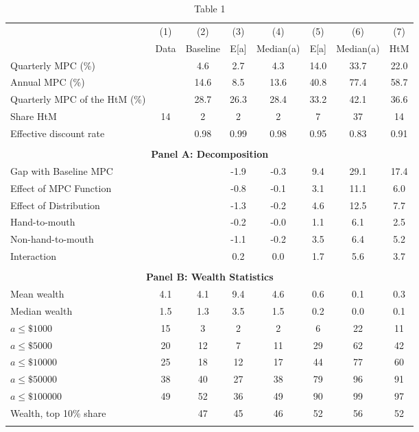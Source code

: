 
    \begin{table}[ht] %
    \caption*{Table 1} %
    \centering
    \begin{threeparttable} %
    \begin{tabular}{lccccccc}
    \toprule
    {} &  (1)  &  (2)  &  (3)  &  (4)  &  (5)  &  (6)  &  (7)  \\
     & Data & Baseline & E[a] & Median(a) & E[a] & Median(a) & HtM \\
    \midrule
    Quarterly MPC (\%) &  & 4.6 & 2.7 & 4.3 & 14.0 & 33.7 & 22.0 \\ 
    Annual MPC (\%) &  & 14.6 & 8.5 & 13.6 & 40.8 & 77.4 & 58.7 \\ 
    Quarterly MPC of the HtM (\%) &  & 28.7 & 26.3 & 28.4 & 33.2 & 42.1 & 36.6 \\ 
    Share HtM & 14 & 2 & 2 & 2 & 7 & 37 & 14 \\ 
    Effective discount rate &  & 0.98 & 0.99 & 0.98 & 0.95 & 0.83 & 0.91 \\ 
     & & & & & & & \\ 
    \toprule
    \multicolumn{8}{c}{\textbf{Panel A: Decomposition}} \\
    \midrule
    Gap with Baseline MPC &  &  & -1.9 & -0.3 & 9.4 & 29.1 & 17.4 \\ 
    Effect of MPC Function &  &  & -0.8 & -0.1 & 3.1 & 11.1 & 6.0 \\ 
    Effect of Distribution &  &  & -1.3 & -0.2 & 4.6 & 12.5 & 7.7 \\ 
    \quad Hand-to-mouth &  &  & -0.2 & -0.0 & 1.1 & 6.1 & 2.5 \\ 
    \quad Non-hand-to-mouth &  &  & -1.1 & -0.2 & 3.5 & 6.4 & 5.2 \\ 
    Interaction &  &  & 0.2 & 0.0 & 1.7 & 5.6 & 3.7 \\ 
     & & & & & & & \\ 
    \toprule
    \multicolumn{8}{c}{\textbf{Panel B: Wealth Statistics}} \\
    \midrule
    Mean wealth & 4.1 & 4.1 & 9.4 & 4.6 & 0.6 & 0.1 & 0.3 \\ 
    Median wealth & 1.5 & 1.3 & 3.5 & 1.5 & 0.2 & 0.0 & 0.1 \\ 
    $a \leq \$1000$ & 15 & 3 & 2 & 2 & 6 & 22 & 11 \\ 
    $a \leq \$5000$ & 20 & 12 & 7 & 11 & 29 & 62 & 42 \\ 
    $a \leq \$10000$ & 25 & 18 & 12 & 17 & 44 & 77 & 60 \\ 
    $a \leq \$50000$ & 38 & 40 & 27 & 38 & 79 & 96 & 91 \\ 
    $a \leq \$100000$ & 49 & 52 & 36 & 49 & 90 & 99 & 97 \\ 
    Wealth, top 10\% share &  & 47 & 45 & 46 & 52 & 56 & 52 \\ 
     & & & & & & & \\ 
    \bottomrule
    \end{tabular}
    \end{threeparttable} %
    \label{tab:table_baseline}
    \end{table} %